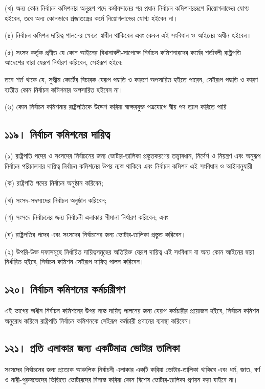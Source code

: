 \documentclass[11pt]{article}
\begin{document}
(খ) অন্য কোন নির্বাচন কমিশনার অনুরূপ পদে কর্মাবসানের পর প্রধান নির্বাচন
    কমিশনাররূপে নিয়োগলাভের যোগ্য হইবেন, তবে অন্য কোনভাবে প্রজাতন্ত্রের কর্মে
    নিয়োগলাভের যোগ্য হইবেন না।

(৪) নির্বাচন কমিশন দায়িত্ব পালনের ক্ষেত্রে স্বাধীন থাকিবেন এবং কেবল এই
    সংবিধান ও আইনের অধীন হইবেন।

(৫) সংসদ কর্তৃক প্রণীত যে কোন আইনের বিধানাবলী-সাপেক্ষে নির্বাচন কমিশনারদের
    কর্মের শর্তাবলী রাষ্ট্রপতি আদেশের দ্বারা যেরূপ নির্ধারণ করিবেন, সেইরূপ হইবে:

তবে শর্ত থাকে যে, সুপ্রীম কোর্টের বিচারক যেরূপ পদ্ধতি ও কারণে অপসারিত হইতে
পারেন, সেইরূপ পদ্ধতি ও কারণ ব্যতীত কোন নির্বাচন কমিশনার অপসারিত হইবেন না।

(৬) কোন নির্বাচন কমিশনার রাষ্ট্রপতিকে উদ্দেশ করিয়া স্বাক্ষরযুক্ত পত্রযোগে স্বীয়
    পদ ত্যাগ করিতে পারি

\subsection{১১৯। নির্বাচন কমিশনের দায়িত্ব}
\label{sec:org81f7cde}
(১) রাষ্ট্রপতি পদের ও সংসদের নির্বাচনের জন্য ভোটার-তালিকা প্রস্তুতকরণের
    তত্ত্বাবধান, নির্দেশ ও নিয়ন্ত্রণ এবং অনুরূপ নির্বাচন পরিচালনার দায়িত্ব নির্বাচন
    কমিশনের উপর ন্যস্ত থাকিবে এবং নির্বাচন কমিশন এই সংবিধান ও আইনানুযায়ী

(ক) রাষ্ট্রপতি পদের নির্বাচন অনুষ্ঠান করিবেন;

(খ) সংসদ-সদস্যদের নির্বাচন অনুষ্ঠান করিবেন;

(গ) সংসদে নির্বাচনের জন্য নির্বাচনী এলাকার সীমানা নির্ধারণ করিবেন; এবং

(ঘ) রাষ্ট্রপতির পদের এবং সংসদের নির্বাচনের জন্য ভোটার-তালিকা প্রস্তুত করিবেন।

(২) উপরি-উক্ত দফাসমূহে নির্ধারিত দায়িত্বসমূহের অতিরিক্ত যেরূপ দায়িত্ব এই
    সংবিধান বা অন্য কোন আইনের দ্বারা নির্ধারিত হইবে, নির্বাচন কমিশন সেইরূপ
    দায়িত্ব পালন করিবেন।

\subsection{১২০। নির্বাচন কমিশনের কর্মচারীগণ}
\label{sec:orgee59e11}
এই ভাগের অধীন নির্বাচন কমিশনের উপর ন্যস্ত দায়িত্ব পালনের জন্য যেরূপ কর্মচারীর
প্রয়োজন হইবে, নির্বাচন কমিশন অনুরোধ করিলে রাষ্ট্রপতি নির্বাচন কমিশনকে সেইরূপ
কর্মচারী প্রদানের ব্যবস্থা করিবেন।

\subsection{১২১। প্রতি এলাকার জন্য একটিমাত্র ভোটার তালিকা}
\label{sec:org18f58a6}
সংসদের নির্বাচনের জন্য প্রত্যেক আঞ্চলিক নির্বাচনী এলাকার একটি করিয়া
ভোটার-তালিকা থাকিবে এবং ধর্ম, জাত, বর্ণ ও নারী-পুরুষভেদের ভিত্তিতে ভোটারদের
বিন্যস্ত করিয়া কোন বিশেষ ভোটার-তালিকা প্রণয়ন করা যাইবে না।
\end{document}
